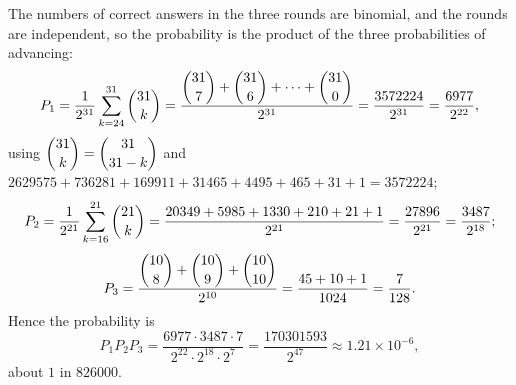 The numbers of correct answers in the three rounds are binomial, and the rounds are independent, so the probability is the product of the three probabilities of advancing:
\[P_1=\dfrac{1}{2^{31}}\sum_{k=24}^{31}\dbinom{31}{k}=\dfrac{\dbinom{31}{7}+\dbinom{31}{6}+\cdots+\dbinom{31}{0}}{2^{31}}=\dfrac{3572224}{2^{31}}=\dfrac{6977}{2^{22}},\]
using $\dbinom{31}{k}=\dbinom{31}{31-k}$ and $2629575+736281+169911+31465+4495+465+31+1=3572224$;
\[P_2=\dfrac{1}{2^{21}}\sum_{k=16}^{21}\dbinom{21}{k}=\dfrac{20349+5985+1330+210+21+1}{2^{21}}=\dfrac{27896}{2^{21}}=\dfrac{3487}{2^{18}};\]
\[P_3=\dfrac{\dbinom{10}{8}+\dbinom{10}{9}+\dbinom{10}{10}}{2^{10}}=\dfrac{45+10+1}{1024}=\dfrac{7}{128}.\]
Hence the probability is
\[P_1P_2P_3=\dfrac{6977\cdot3487\cdot7}{2^{22}\cdot2^{18}\cdot2^7}=\boxed{\dfrac{170301593}{2^{47}}}\approx1.21\times10^{-6},\]
about $1$ in $826000$.
